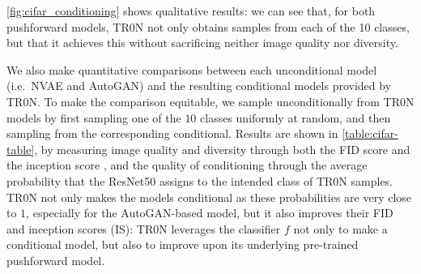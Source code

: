 \documentclass[nohyperref]{article}
\theoremstyle{plain}
\theoremstyle{definition}
\theoremstyle{remark}
\begin{document}
\autoref{fig:cifar_conditioning} shows qualitative results: we can see that, for both pushforward models, TR0N not only obtains samples from each of the 10 classes, but that it achieves this without sacrificing neither image quality nor diversity. 

We also make quantitative comparisons between each unconditional model (i.e.\ NVAE and AutoGAN) and the resulting conditional models provided by TR0N. To make the comparison equitable, we sample unconditionally from TR0N models by first sampling one of the $10$ classes uniformly at random, and then sampling from the corresponding conditional. Results are shown in \autoref{table:cifar-table}, by measuring image quality and diversity through both the FID score and the inception score \citep{salimans2016improved}, and the quality of conditioning through the average probability that the ResNet50 assigns to the intended class of TR0N samples. TR0N not only makes the models conditional as these probabilities are very close to $1$, especially for the AutoGAN-based model, but it also improves their FID and inception scores (IS): TR0N leverages the classifier $f$ not only to make a conditional model, but also to improve upon its underlying pre-trained pushforward model.
\end{document}
